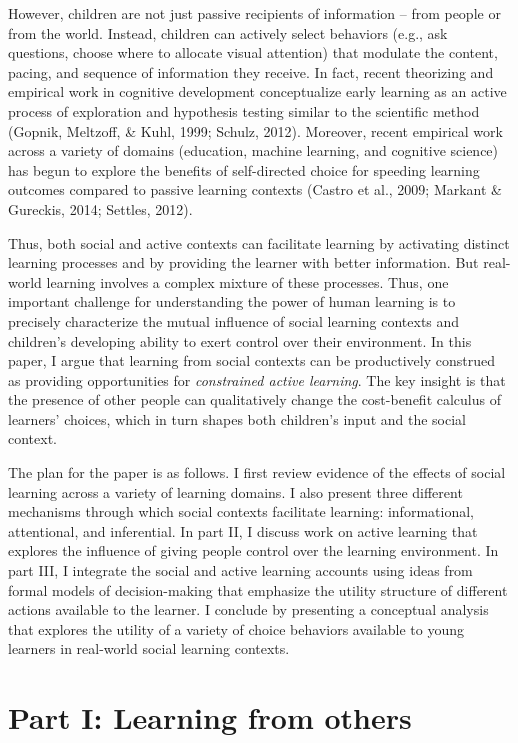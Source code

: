 \documentclass[a4paper,man,apacite,floatsintext]{apa6}
\begin{document}
However, children are not just passive recipients of information -- from
people or from the world. Instead, children can actively select
behaviors (e.g., ask questions, choose where to allocate visual
attention) that modulate the content, pacing, and sequence of
information they receive. In fact, recent theorizing and empirical work
in cognitive development conceptualize early learning as an active
process of exploration and hypothesis testing similar to the scientific
method (Gopnik, Meltzoff, \& Kuhl, 1999; Schulz, 2012). Moreover, recent
empirical work across a variety of domains (education, machine learning,
and cognitive science) has begun to explore the benefits of
self-directed choice for speeding learning outcomes compared to passive
learning contexts (Castro et al., 2009; Markant \& Gureckis, 2014;
Settles, 2012).

Thus, both social and active contexts can facilitate learning by
activating distinct learning processes and by providing the learner with
better information. But real-world learning involves a complex mixture
of these processes. Thus, one important challenge for understanding the
power of human learning is to precisely characterize the mutual
influence of social learning contexts and children's developing ability
to exert control over their environment. In this paper, I argue that
learning from social contexts can be productively construed as providing
opportunities for \emph{constrained active learning}. The key insight is
that the presence of other people can qualitatively change the
cost-benefit calculus of learners' choices, which in turn shapes both
children's input and the social context.

The plan for the paper is as follows. I first review evidence of the
effects of social learning across a variety of learning domains. I also
present three different mechanisms through which social contexts
facilitate learning: informational, attentional, and inferential. In
part II, I discuss work on active learning that explores the influence
of giving people control over the learning environment. In part III, I
integrate the social and active learning accounts using ideas from
formal models of decision-making that emphasize the utility structure of
different actions available to the learner. I conclude by presenting a
conceptual analysis that explores the utility of a variety of choice
behaviors available to young learners in real-world social learning
contexts.

\section{Part I: Learning from
others}\label{part-i-learning-from-others}
\end{document}
